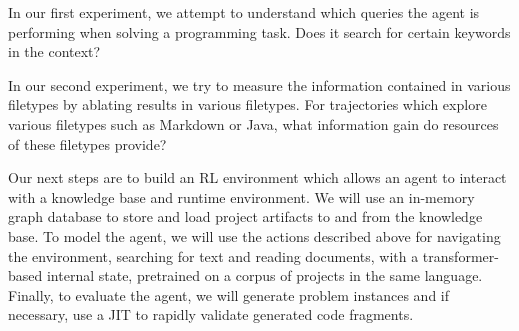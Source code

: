 \documentclass[11pt]{article}
\begin{document}
In our first experiment, we attempt to understand which queries the agent is performing when solving a programming task. Does it search for certain keywords in the context?

In our second experiment, we try to measure the information contained in various filetypes by ablating results in various filetypes. For trajectories which explore various filetypes such as Markdown or Java, what information gain do resources of these filetypes provide?

Our next steps are to build an RL environment which allows an agent to interact with a knowledge base and runtime environment. We will use an in-memory graph database to store and load project artifacts to and from the knowledge base. To model the agent, we will use the actions described above for navigating the environment, searching for text and reading documents, with a transformer-based internal state, pretrained on a corpus of projects in the same language. Finally, to evaluate the agent, we will generate problem instances and if necessary, use a JIT to rapidly validate generated code fragments.

  
  
\end{document}
